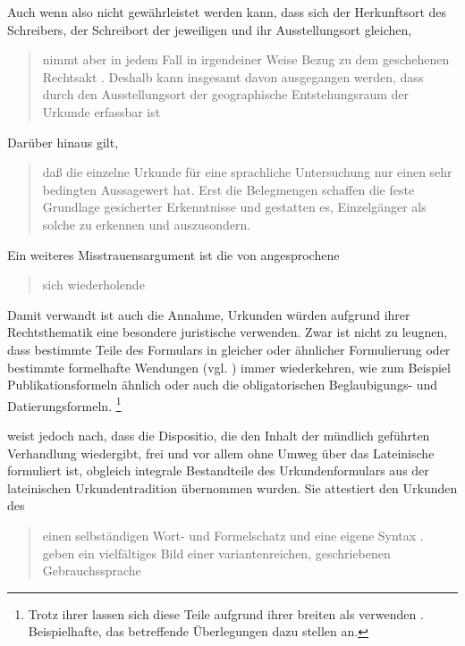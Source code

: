 Auch wenn also nicht gewährleistet werden kann, dass sich der Herkunftsort des
Schreibers, der Schreibort der jeweiligen
 und ihr Ausstellungsort gleichen,
\blockcquote[331--332]{ganslmayeretal2003}{nimmt 
aber in jedem Fall in irgendeiner Weise Bezug zu dem geschehenen Rechtsakt
\textelp{}. Deshalb kann insgesamt davon ausgegangen werden, dass durch den
Ausstellungsort der geographische Entstehungsraum der
Urkunde erfassbar ist}. Darüber hinaus gilt, \blockcquote[122]{deboor1974}{daß
die einzelne Urkunde für eine sprachliche Untersuchung nur einen sehr bedingten
Aussagewert hat. Erst die Belegmengen schaffen die feste Grundlage gesicherter
Erkenntnisse und gestatten es, Einzelgänger als solche zu erkennen und
auszusondern.}

Ein weiteres Misstrauensargument ist die von
\citet[1311]{wegera2000} angesprochene \blockquote{sich wiederholende
}. Damit verwandt ist auch die Annahme,
Urkunden würden aufgrund ihrer Rechtsthematik eine besondere
juristische  verwenden. Zwar ist nicht zu leugnen, dass
bestimmte Teile des Formulars in gleicher oder ähnlicher Formulierung oder
bestimmte formelhafte Wendungen (vgl. ) immer
wiederkehren, wie zum Beispiel Publikationsformeln ähnlich   oder auch die
obligatorischen Beglaubigungs- und Datierungsformeln.%
%
	\footnote{%
	Trotz ihrer  lassen sich diese Teile aufgrund ihrer
	breiten  als  verwenden
	\autocite[siehe][]{cysouwwaelchli2007}. Beispielhafte, das \CAO{}
	betreffende Überlegungen dazu stellen
	\citet[174--175]{beckerschallert2022b} an.}

\citet[13, 25--38]{schulze2011} weist jedoch nach, dass die Dispositio, die den
Inhalt der mündlich geführten Verhandlung wiedergibt, frei und
vor allem ohne Umweg über das Lateinische
formuliert ist, obgleich integrale Bestandteile des
Urkundenformulars aus der lateinischen
Urkundentradition übernommen wurden. Sie attestiert den Urkunden des \CAO{}
\blockcquote[3]{schulze1994}{einen selbständigen Wort- und Formelschatz und
eine eigene Syntax \textelp{}.  geben ein vielfältiges
Bild einer variantenreichen, geschriebenen
Gebrauchs\-sprache}.

